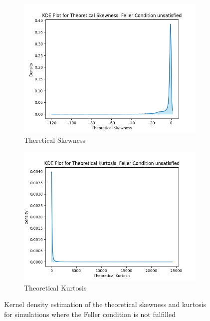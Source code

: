 \begin{figure}
    \centering
    \begin{subfigure}[b]{0.4\textwidth}
        \centering
        \includegraphics[width=\textwidth]{img/kde_theoretical_skewness_feller_false.png}
        \caption{Theretical Skewness}
    \end{subfigure}
    \hfill
    \begin{subfigure}[b]{0.4\textwidth}
        \centering
        \includegraphics[width=\textwidth]{img/kde_theoretical_kurtosis_feller_false.png}
        \caption{Theoretical Kurtosis}
    \end{subfigure}
    \caption{Kernel density estimation of the theoretical skewness and kurtosis for simulations where the Feller condition is not fulfilled}
    \label{fig:kde_theoretical_skewness_kurtosis_feller_false}
\end{figure}

